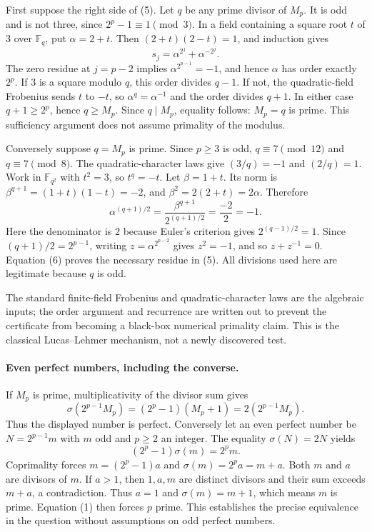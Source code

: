 \documentclass[11pt]{article}
\begin{document}
First suppose the right side of (5). Let $q$ be any prime divisor of
$M_p$. It is odd and is not three, since $2^p-1\equiv1\pmod3$.
In a field containing a square root $t$ of $3$ over $\mathbb F_q$, put
$\alpha=2+t$. Then $(2+t)(2-t)=1$, and induction gives
\[
                      s_j=\alpha^{2^j}+\alpha^{-2^j}.    \tag{6}
\]
The zero residue at $j=p-2$ implies
$\alpha^{2^{p-1}}=-1$, and hence $\alpha$ has order exactly $2^p$.
If $3$ is a square modulo $q$, this order divides $q-1$.
If not, the quadratic-field Frobenius sends $t$ to $-t$, so
$\alpha^q=\alpha^{-1}$ and the order divides $q+1$.
In either case $q+1\ge2^p$, hence $q\ge M_p$.
Since $q\mid M_p$, equality follows: $M_p=q$ is prime.
This sufficiency argument does not assume primality of the modulus.

Conversely suppose $q=M_p$ is prime. Since $p\ge3$ is odd,
$q\equiv7\pmod{12}$ and $q\equiv7\pmod8$.
The quadratic-character laws give $(3/q)=-1$ and $(2/q)=1$.
Work in $\mathbb F_{q^2}$ with $t^2=3$, so $t^q=-t$.
Let $\beta=1+t$. Its norm is
$\beta^{q+1}=(1+t)(1-t)=-2$, and
$\beta^2=2(2+t)=2\alpha$. Therefore
\[
 \alpha^{(q+1)/2}
   =\frac{\beta^{q+1}}{2^{(q+1)/2}}
   =\frac{-2}{2}=-1.                                   \tag{7}
\]
Here the denominator is $2$ because Euler's criterion gives
$2^{(q-1)/2}=1$. Since $(q+1)/2=2^{p-1}$, writing
$z=\alpha^{2^{p-2}}$ gives $z^2=-1$, and so
$z+z^{-1}=0$. Equation (6) proves the necessary residue in (5).
All divisions used here are legitimate because $q$ is odd.

The standard finite-field Frobenius and quadratic-character laws are
the algebraic inputs; the order argument and recurrence are written
out to prevent the certificate from becoming a black-box numerical
primality claim. This is the classical Lucas--Lehmer mechanism,
not a newly discovered test.

\paragraph{Even perfect numbers, including the converse.}
If $M_p$ is prime, multiplicativity of the divisor sum gives
\[
 \sigma(2^{p-1}M_p)=(2^p-1)(M_p+1)=2(2^{p-1}M_p).
\]
Thus the displayed number is perfect.
Conversely let an even perfect number be $N=2^{p-1}m$ with $m$ odd
and $p\ge2$ an integer. The equality $\sigma(N)=2N$ yields
\[
                    (2^p-1)\sigma(m)=2^p m.
\]
Coprimality forces $m=(2^p-1)a$ and $\sigma(m)=2^p a=m+a$.
Both $m$ and $a$ are divisors of $m$. If $a>1$, then $1,a,m$
are distinct divisors and their sum exceeds $m+a$, a contradiction.
Thus $a=1$ and $\sigma(m)=m+1$, which means $m$ is prime.
Equation (1) then forces $p$ prime. This establishes the precise
equivalence in the question without assumptions on odd perfect numbers.
\end{document}
